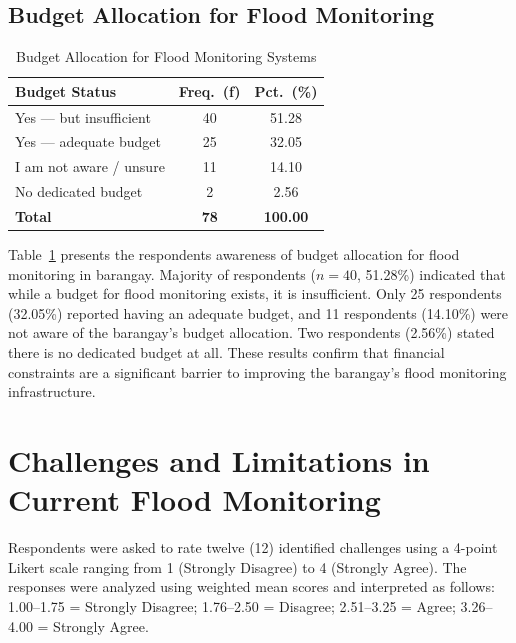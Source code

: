 \documentclass{research}
\begin{document}
\subsection{Budget Allocation for Flood Monitoring}
 
\begin{table}[htbp]
\centering
\small
\caption{Budget Allocation for Flood Monitoring Systems}
\label{tab:budget}
\begin{tabular}{p{9.5cm}|c|c}
\hline
\textbf{Budget Status} & \textbf{Freq.\ (f)} & \textbf{Pct.\ (\%)} \\
\hline
Yes --- but insufficient    & 40 & 51.28 \\
Yes --- adequate budget     & 25 & 32.05 \\
I am not aware / unsure     & 11 & 14.10 \\
No dedicated budget         &  2 &  2.56 \\
\hline
\textbf{Total}              & \textbf{78} & \textbf{100.00} \\
\hline
\end{tabular}
\end{table}
 
Table~\ref{tab:budget} presents the respondents awareness of budget allocation for flood monitoring in barangay. Majority of respondents ($n=40$, 51.28\%)
indicated that while a budget for flood monitoring exists, it is insufficient. Only 25
respondents (32.05\%) reported having an adequate budget, and 11 respondents
(14.10\%) were not aware of the barangay's budget allocation. Two respondents (2.56\%)
stated there is no dedicated budget at all. These results confirm that financial
constraints are a significant barrier to improving the barangay's flood monitoring
infrastructure.
 
\section{Challenges and Limitations in Current Flood Monitoring}
 
Respondents were asked to rate twelve (12) identified challenges using a 4-point Likert
scale ranging from 1 (Strongly Disagree) to 4 (Strongly Agree). The responses were
analyzed using weighted mean scores and interpreted as follows: 1.00--1.75 =
Strongly Disagree; 1.76--2.50 = Disagree; 2.51--3.25 = Agree; 3.26--4.00 = Strongly
Agree.
 
\end{document}
